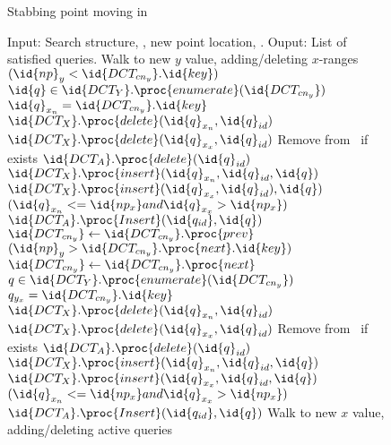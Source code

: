 \documentclass{sig-alternate}
\newcommand{\meth}{.}
\newcommand{\inC}[1]{{\id{DCT_{#1}}}}
\newcommand{\X}{{\inC{X}}}
\newcommand{\Y}{{\inC{Y}}}
\newcommand{\A}{{\inC{A}}}
\newcommand{\cny}{{\inC{cn_y}}}
\begin{document}
\begin{figure*}[htbp]
  \centering
  
  \caption{Stabbing point moving in }
  \label{fig:update}
\end{figure*}


\begin{figure}[htbp]
  \centering
\begin{codebox}
\li \Comment Input: Search structure, , new point location, .
\li \Comment Ouput: List of satisfied queries.
\li \Comment Walk to new $y$ value, adding/deleting $x$-ranges
\li \While $(\id{np}_y < \cny \meth \id{key})$ \label{li:report-y-loop-begin}
\li   \Do
      $\id{q} \in \Y \meth \proc{enumerate}(\cny)$
\li       \Do
         \If $\id{q}_{x_n} = \cny \meth \id{key}$
\li            \Then
\li               $\X \meth \proc{delete}(\id{q}_{x_n},\id{q}_{id})$
\li               $\X \meth \proc{delete}(\id{q}_{x_x},\id{q}_{id})$
\li               \Comment Remove from \A\ if exists
\li               $\A \meth \proc{delete}(\id{q}_{id})$
\li            \Else
\li               $\X \meth \proc{insert}(\id{q}_{x_n},\id{q}_{id},\id{q})$
\li               $\X \meth \proc{insert}(\id{q}_{x_x},\id{q}_{id}),\id{q})$
\li               \If $(\id{q}_{x_n} <= \id{np_x} and \id{q}_{x_x} > \id{np_x})$
\li                  \Then 
\li                     $\A \meth \proc{Insert}(\id{q_{id}},\id{q})$
                     \End
           \End
      \End
\li   $\cny \gets \cny \meth \proc{prev}$
  \End
\li \While $(\id{np}_y > \cny \meth \proc{next} \meth \id{key})$
\li   \Do
     $\cny \gets \cny \meth \proc{next}$
\li     {} $q \in \Y \meth \proc{enumerate}(\cny)$
\li       \Do
         \If $q_{y_x} = \cny \meth \id{key}$
\li            \Then
\li               $\X \meth \proc{delete}(\id{q}_{x_n},\id{q}_{id})$
\li               $\X \meth \proc{delete}(\id{q}_{x_x},\id{q}_{id})$
\li               \Comment Remove from \A\ if exists 
\li               $\A \meth \proc{delete}(\id{q}_{id})$
\li            \Else
\li               $\X \meth \proc{insert}(\id{q}_{x_n},\id{q}_{id},\id{q})$
\li               $\X \meth \proc{insert}(\id{q}_{x_x},\id{q}_{id},\id{q})$
\li               \If $(\id{q}_{x_n} <= \id{np_x} and \id{q}_{x_x} > \id{np_x})$
\li                  \Then 
\li                     $\A \meth \proc{Insert}(\id{q_{id}},\id{q})$
                     \End
            \End
       \End
   \End                                     \label{li:report-y-loop-end}
\li \Comment Walk to new $x$ value, adding/deleting active queries

\end{codebox}
\end{figure}
\end{document}
